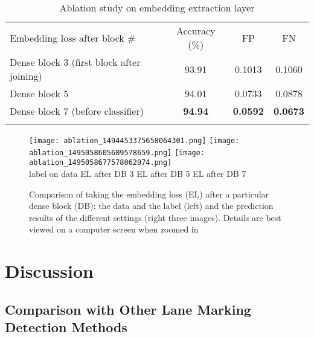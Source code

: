 \documentclass{article} \usepackage{nips13submit_e,times}
\begin{document}
\setlength{\tabcolsep}{4pt}
\begin{table}
\begin{center}
    \caption{Ablation study on embedding extraction layer}
    \label{table:embedding_layer}
    \begin{tabular}{l|ccc}
      \hline\noalign{\smallskip}
      Embedding loss after block \# & Accuracy (\%) & FP & FN \\
      \noalign{\smallskip}\hline\noalign{\smallskip}
      Dense block 3 (first block after joining) & 93.91 & 0.1013 & 0.1060 \\
      Dense block 5 & 94.01 & 0.0733 & 0.0878 \\
      Dense block 7 (before classifier) & \textbf{94.94} & \textbf{0.0592} & \textbf{0.0673} \\
      \noalign{\smallskip}\hline
    \end{tabular}
  \end{center}
\end{table}
\setlength{\tabcolsep}{1.4pt}

\begin{figure}[t]
  \centering
  \texttt{[image: ablation\_1494453375658064301.png]}
  \texttt{[image: ablation\_1495058605609578659.png]}
  \texttt{[image: ablation\_1495058677578062974.png]}\\
  {\hspace{0.5em} label on data \hspace{3em} EL after DB 3 \hspace{3em} EL after DB 5 \hspace{3em} EL after DB 7 \hspace{0.5em}}
  \caption{Comparison of taking the embedding loss (EL) after a particular dense block (DB): the data and the label (left) and the prediction results of the different settings (right three images).
  Details are best viewed on a computer screen when zoomed in
  }
  \label{fig:embedding_layer}
\end{figure}



\section{Discussion}
\subsection{Comparison with Other Lane Marking Detection Methods}
\label{sec:tusimple_comparison}
\end{document}
